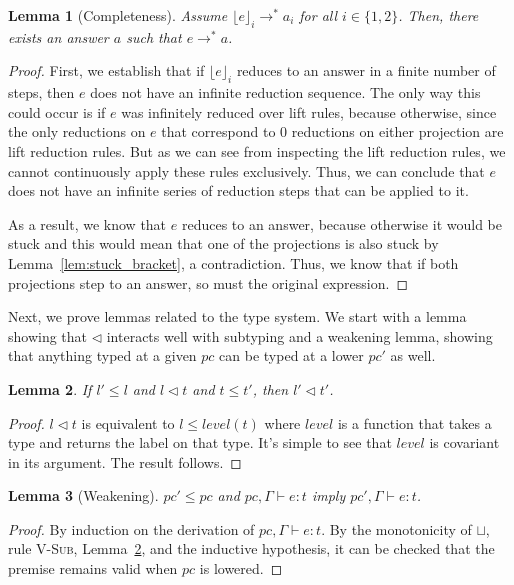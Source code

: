 \documentclass[a4paper,twocolumn]{article}
\newcommand{\typeRule}[3]{#1 \vdash #2 \colon #3}
\newcommand{\guards}[0]{\lhd}
\newcommand{\lift}[1]{\lfloor #1 \rfloor}
\theoremstyle{plain}
\newtheorem{lemma}{Lemma}
\theoremstyle{definition}
\begin{document}
\begin{lemma}[Completeness]
  \label{lem:completeness}
  Assume $\lift{e}_i \to^* a_i$ for all $i \in \{1, 2\}$.  Then, there exists an
  answer $a$ such that $e \to^* a$.
\end{lemma}
\begin{proof}
  First, we establish that if $\lift{e}_i$ reduces to an answer in a finite
  number of steps, then $e$ does not have an infinite reduction sequence.  The
  only way this could occur is if $e$ was infinitely reduced over lift rules,
  because otherwise, since the only reductions on $e$ that correspond to 0
  reductions on either projection are lift reduction rules.  But as we can see
  from inspecting the lift reduction rules, we cannot continuously apply these
  rules exclusively.  Thus, we can conclude that $e$ does not have an infinite
  series of reduction steps that can be applied to it.

  As a result, we know that $e$ reduces to an answer, because otherwise it would
  be stuck and this would mean that one of the projections is also stuck by
  Lemma~\ref{lem:stuck_bracket}, a contradiction.  Thus, we know that if both
  projections step to an answer, so must the original expression.
\end{proof}

Next, we prove lemmas related to the type system.  We start with a lemma showing
that $\guards$ interacts well with subtyping and a weakening lemma, showing that
anything typed at a given $pc$ can be typed at a lower $pc'$ as well.

\begin{lemma}
  \label{lem:guard_subtype}
  If $l' \leq l$ and $l \guards t$ and $t \leq t'$, then $l' \guards t'$.
\end{lemma}
\begin{proof}
  $l \guards t$ is equivalent to $l \leq level(t)$ where $level$ is a function
  that takes a type and returns the label on that type.  It's simple to see that
  $level$ is covariant in its argument.  The result follows.
\end{proof}

\begin{lemma}[Weakening]
  \label{lem:weakening}
  $pc' \leq pc$ and $\typeRule{pc, \Gamma}{e}{t}$ imply $\typeRule{pc',
  \Gamma}{e}{t}$.
\end{lemma}
\begin{proof}
  By induction on the derivation of $\typeRule{pc, \Gamma}{e}{t}$.  By the
  monotonicity of $\sqcup$, rule \textsc{V-Sub}, Lemma~\ref{lem:guard_subtype},
  and the inductive hypothesis, it can be checked that the premise remains valid
  when $pc$ is lowered.
\end{proof}
\end{document}
